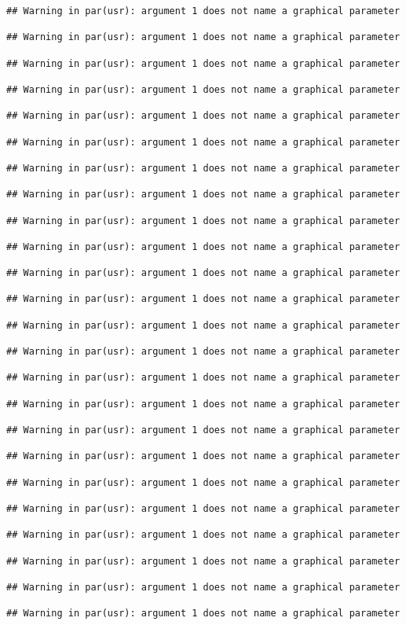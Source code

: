 \documentclass[
]{article}
\begin{document}
\begin{verbatim}
## Warning in par(usr): argument 1 does not name a graphical parameter

## Warning in par(usr): argument 1 does not name a graphical parameter

## Warning in par(usr): argument 1 does not name a graphical parameter

## Warning in par(usr): argument 1 does not name a graphical parameter

## Warning in par(usr): argument 1 does not name a graphical parameter

## Warning in par(usr): argument 1 does not name a graphical parameter

## Warning in par(usr): argument 1 does not name a graphical parameter

## Warning in par(usr): argument 1 does not name a graphical parameter

## Warning in par(usr): argument 1 does not name a graphical parameter

## Warning in par(usr): argument 1 does not name a graphical parameter

## Warning in par(usr): argument 1 does not name a graphical parameter

## Warning in par(usr): argument 1 does not name a graphical parameter

## Warning in par(usr): argument 1 does not name a graphical parameter

## Warning in par(usr): argument 1 does not name a graphical parameter

## Warning in par(usr): argument 1 does not name a graphical parameter

## Warning in par(usr): argument 1 does not name a graphical parameter

## Warning in par(usr): argument 1 does not name a graphical parameter

## Warning in par(usr): argument 1 does not name a graphical parameter

## Warning in par(usr): argument 1 does not name a graphical parameter

## Warning in par(usr): argument 1 does not name a graphical parameter

## Warning in par(usr): argument 1 does not name a graphical parameter

## Warning in par(usr): argument 1 does not name a graphical parameter

## Warning in par(usr): argument 1 does not name a graphical parameter

## Warning in par(usr): argument 1 does not name a graphical parameter


\end{verbatim}
\end{document}
